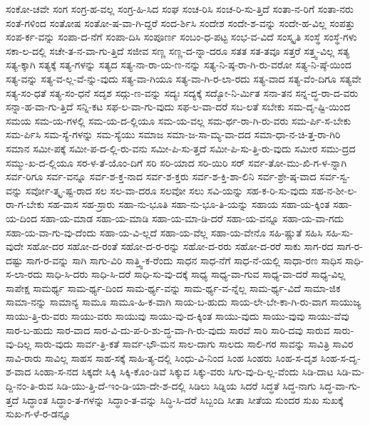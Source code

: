 {ಸಂಕೋ-ಚವೇ
ಸಂಗ
ಸಂಗ್ರ-ಹ-ವಲ್ಲ
ಸಂಗ್ರ-ಹಿ-ಸಿದ
ಸಂಘ
ಸಂಚ-ರಿಸಿ
ಸಂಚ-ರಿ-ಸು-ತ್ತಿದೆ
ಸಂತಾ-ನ-ರಿಗೆ
ಸಂತಾ-ನರು
ಸಂತೆ-ಗಳಿಂದ
ಸಂತೋಷ
ಸಂತೋ-ಷ-ವಾ-ಗಿ-ದ್ದರೆ
ಸಂದ-ರ್ಶಿಸಿ
ಸಂದೇಶ
ಸಂದೇ-ಶ-ವನ್ನು
ಸಂದೇ-ಹ-ವಿಲ್ಲ
ಸಂಪತ್ತು
ಸಂಪ-ರ್ಕ-ವನ್ನು
ಸಂಪಾ-ದ-ನೆಗೆ
ಸಂಪಾ-ದಿಸಿ
ಸಂಪೂರ್ಣ
ಸಂಬಂ-ಧ-ಪಟ್ಟ
ಸಂಭ-ವ-ವಿದೆ
ಸಂಸ್ಕೃತಿ
ಸಂಸ್ಥೆ
ಸಂಸ್ಥೆ-ಗಳು
ಸಕಾ-ಲ-ದಲ್ಲಿ
ಸಚೇ-ತ-ನ-ವಾ-ಗು-ತ್ತಿದೆ
ಸಜೀವ
ಸಣ್ಣ
ಸಣ್ಣ-ದ-ನ್ನಾ-ದರೂ
ಸತತ
ಸತ-ತವೂ
ಸತ್ತರೆ
ಸತ್ತ್ವ-ವಿಲ್ಲ
ಸತ್ಯ
ಸತ್ಯ-ಕ್ಕಾಗಿ
ಸತ್ಯಕ್ಕೆ
ಸತ್ಯ-ಗಳನ್ನು
ಸತ್ಯದ
ಸತ್ಯ-ನಾ-ರಾ-ಯ-ಣ-ನನ್ನು
ಸತ್ಯ-ನಿ-ಷ್ಠ-ರಾ-ಗಿ-ರು-ವರೋ
ಸತ್ಯ-ನಿ-ಷ್ಠೆ-ಯಿಂದ
ಸತ್ಯ-ವನ್ನು
ಸತ್ಯ-ವ-ಲ್ಲ-ವೆ-ನ್ನು-ವುದು
ಸತ್ಯ-ವಾ-ಗಿಯೂ
ಸತ್ಯ-ವಾ-ಗಿ-ರ-ಲಾ-ರದು
ಸತ್ಯ-ವಾದ
ಸತ್ಯ-ವೆಂ-ದಿಗೂ
ಸತ್ಯವೇ
ಸತ್ಯ-ಸಂ-ಧತೆ
ಸತ್ಯ-ಸಂ-ಧನೆ
ಸದೃಶ
ಸದ್ಗು-ಣ-ವನ್ನು
ಸದ್ಯಃ
ಸದ್ಯಕ್ಕೆ
ಸದ್ಯೋ-ನಿ-ರ್ಮಿತ
ಸನಾ-ತನ
ಸನ್ನ-ದ್ಧ-ರಾ-ದ-ವರು
ಸನ್ನಾ-ಹ-ವಾ-ಗು-ತ್ತಿದೆ
ಸನ್ನಿ-ಕಟ
ಸಫ-ಲ-ವಾ-ಗು-ವುದು
ಸಫ-ಲ-ವಾ-ದರೆ
ಸಬ-ಲತೆ
ಸಬೇಕು
ಸಮ-ದೃ-ಷ್ಟಿ-ಯಿಂದ
ಸಮಯ
ಸಮ-ಯ-ಗಳಲ್ಲಿ
ಸಮ-ಯ-ದ-ಲ್ಲಿಯೂ
ಸಮ-ಯ-ವಲ್ಲ
ಸಮ-ರ್ಥ-ರಾ-ಗಿ-ರು-ವರು
ಸಮ-ರ್ಪಿ-ಸ-ಬೇಕು
ಸಮ-ರ್ಪಿಸಿ
ಸಮ-ಸ್ಯೆ-ಗಳನ್ನು
ಸಮ-ಸ್ಯೆಯು
ಸಮಾಜ
ಸಮಾ-ಜ-ಸಾ-ಮ್ಯ-ವಾ-ದದ
ಸಮಾ-ಧಾ-ನ-ಚಿ-ತ್ತ-ರಾ-ಗಿರಿ
ಸಮಾನ
ಸಮೀ-ಪಕ್ಕೆ
ಸಮೀ-ಪ-ದ-ಲ್ಲಿ-ರು-ವನು
ಸಮೀ-ಪಿ-ಸು-ತ್ತದೆ
ಸಮೀ-ಪಿ-ಸು-ತ್ತಿ-ರು-ವುದು
ಸಮೀರ
ಸಮು-ದ್ರದ
ಸಮ್ಮು-ಖ-ದ-ಲ್ಲಿಯೂ
ಸರ-ಳ-ತೆ-ಯೊಂ-ದಿಗೆ
ಸರಿ
ಸರಿ-ಯಾದ
ಸರಿ-ಯಿರಿ
ಸರ್
ಸರ್ವ-ತೋ-ಮು-ಖಿ-ಗ-ಳ-ನ್ನಾಗಿ
ಸರ್ವ-ರಿಗೂ
ಸರ್ವ-ವನ್ನೂ
ಸರ್ವ-ಶ-ಕ್ತ-ನಾದ
ಸರ್ವ-ಶ-ಕ್ತರು
ಸರ್ವ-ಶ-ಕ್ತಿ-ಶಾ-ಲಿನಿ
ಸರ್ವ-ಶ್ರೇ-ಷ್ಠ-ವಾದ
ಸರ್ವ-ಸ್ವ-ವನ್ನು
ಸರ್ವೋ-ತ್ಕೃ-ಷ್ಟ-ರಾದ
ಸಲ
ಸಲ-ವಾ-ದರೂ
ಸಲವೋ
ಸಲು
ಸವಿ-ಯನ್ನು
ಸಹ-ಕ-ರಿ-ಸು-ವುದು
ಸಹ-ನ-ಶೀ-ಲ-ರಾ-ಗ-ಬೇಕು
ಸಹ-ವಾಸ
ಸಹ-ಸ್ರಾರು
ಸಹಾ-ನು-ಭೂತಿ
ಸಹಾ-ನು-ಭೂ-ತಿ-ಯನ್ನು
ಸಹಾಯ
ಸಹಾ-ಯ-ಕ್ಕಿಂತ
ಸಹಾ-ಯ-ದಿಂದ
ಸಹಾ-ಯ-ಮಾಡ
ಸಹಾ-ಯ-ಮಾಡಿ
ಸಹಾ-ಯ-ಮಾ-ಡಿ-ದರೆ
ಸಹಾ-ಯ-ವನ್ನೂ
ಸಹಾ-ಯ-ವಾ-ಗದು
ಸಹಾ-ಯ-ವಾ-ಗು-ವು-ದೆಂದು
ಸಹಾ-ಯ-ವಿ-ಲ್ಲದೆ
ಸಹಾ-ಯ-ವೆಲ್ಲ
ಸಹಾ-ಯ-ವೇನೊ
ಸಹಿ-ಷ್ಣುತೆ
ಸಹಿಸಿ
ಸಹಿ-ಸು-ವುದೇ
ಸಹೋ-ದರ
ಸಹೋ-ದ-ರಂತೆ
ಸಹೋ-ದ-ರ-ರನ್ನು
ಸಹೋ-ದ-ರರು
ಸಹೋ-ದ-ರರೆ
ಸಾಕು
ಸಾಗ-ರದ
ಸಾಗ-ರ-ದಷ್ಟು
ಸಾಗ-ರ-ವನ್ನು
ಸಾಗಿ
ಸಾಗು-ವಿರಿ
ಸಾತ್ತ್ವಿ-ಕ-ರೆಂದು
ಸಾಧನ
ಸಾಧ-ನೆಗೆ
ಸಾಧ-ನೆ-ಯಲ್ಲಿ
ಸಾಧಾ-ರಣ
ಸಾಧಿಸ
ಸಾಧಿ-ಸ-ಲಾ-ರದು
ಸಾಧಿ-ಸಿ-ದರು
ಸಾಧಿ-ಸಿ-ದರೆ
ಸಾಧಿ-ಸು-ವು-ದಕ್ಕೆ
ಸಾಧ್ಯ
ಸಾಧ್ಯ-ವಾ-ಗುವ
ಸಾಧ್ಯ-ವಾ-ದರೆ
ಸಾಧ್ಯ-ವಿಲ್ಲ
ಸಾಪೇಕ್ಷ
ಸಾಮರ್ಥ್ಯ
ಸಾಮ-ರ್ಥ್ಯ-ದಿಂದ
ಸಾಮ-ರ್ಥ್ಯ-ವನ್ನು
ಸಾಮ-ರ್ಥ್ಯ-ವ-ನ್ನೆಲ್ಲ
ಸಾಮ-ರ್ಥ್ಯ-ವಿದೆ
ಸಾಮಾ-ಜಿಕ
ಸಾಮಾ-ನನ್ನು
ಸಾಮಾನ್ಯ
ಸಾಮೂ
ಸಾಮೂ-ಹಿ-ಕ-ವಾಗಿ
ಸಾಯ-ಬ-ಹುದು
ಸಾಯ-ಲೇ-ಬೇ-ಕಾ-ಗಿ-ರು-ವಾಗ
ಸಾಯುಜ್ಯ
ಸಾಯು-ತ್ತಿ-ರು-ವರು
ಸಾಯು-ವರು
ಸಾಯುವು
ಸಾಯು-ವು-ದ-ಕ್ಕಿಂತ
ಸಾಯು-ವುದು
ಸಾಯು-ವುವು
ಸಾಯು-ವೆವು
ಸಾರ-ಬ-ಹುದು
ಸಾರ-ವಾದ
ಸಾರ-ವಿ-ದು-ಪ-ರಿ-ಶು-ದ್ಧ-ವಾ-ಗಿ-ರು-ವುದು
ಸಾರವೆ
ಸಾರಿ
ಸಾರಿ-ದವು
ಸಾರುವ
ಸಾರು-ವು-ದಿಲ್ಲ
ಸಾರು-ವುದು
ಸಾರ್ವ-ತ್ರಿ-ಕತೆ
ಸಾರ್ವ-ಭೌ-ಮನ
ಸಾಲ-ದಾಗು
ಸಾಲದು
ಸಾಲಿ-ಗರ
ಸಾವನ್ನು
ಸಾವಿತ್ರಿ
ಸಾವಿರ
ಸಾವಿ-ರಾರು
ಸಾವಿಲ್ಲ
ಸಾಹಸ
ಸಾಹ-ಸಕ್ಕೆ
ಸಾಹಿ-ತ್ಯ-ದಲ್ಲಿ
ಸಿಂಧು-ವಿ-ನಿಂದ
ಸಿಂಹ
ಸಿಂಹರು
ಸಿಂಹ-ಸ-ದೃಶ
ಸಿಂಹ-ಸ-ದೃ-ಶ-ವಾದ
ಸಿಂಹಾ-ಸ-ನದ
ಸಿಕ್ಕದೇ
ಸಿಕ್ಕಿ
ಸಿಕ್ಕಿ-ಕೊಂ-ಡಿವೆ
ಸಿಕ್ಕುವ
ಸಿಕ್ಕು-ವರು
ಸಿಗು-ವು-ದಿ-ಲ್ಲ-ವೆಂದು
ಸಿಡಿ-ದಾಟ
ಸಿಡಿ-ಮ-ದ್ದಿ-ನಂ-ತಿ-ರುವ
ಸಿಡಿ-ಯು-ತ್ತಿ-ದೆ-ಇಂ-ಡಿ-ಯಾ-ದೇ-ಶ-ದಲ್ಲಿ
ಸಿಡಿಲು
ಸಿಡ್ನಿಯ
ಸಿದರೆ
ಸಿದ್ಧತೆ
ಸಿದ್ಧ-ನಾಗು
ಸಿದ್ಧ-ವಾ-ಗು-ತ್ತದೆ
ಸಿದ್ಧಾಂತ
ಸಿದ್ಧಾಂ-ತ-ಗಳನ್ನು
ಸಿದ್ಧಾಂ-ತ-ವನ್ನು
ಸಿದ್ಧಿ-ಸಿ-ದರೆ
ಸಿಬ್ಬಂದಿ
ಸೀತಾ
ಸೀತೆಯ
ಸುಂದರ
ಸುಖ
ಸುಖಕ್ಕೆ
ಸುಖ-ಗ-ಳೆ-ರ-ಡನ್ನೂ
}

